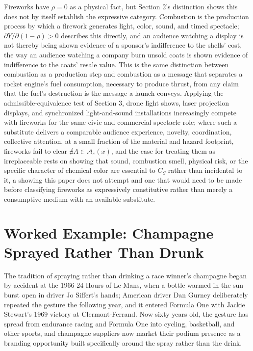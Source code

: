 \documentclass[11pt]{article}
\begin{document}
Fireworks have $\rho = 0$ as a physical fact, but Section 2's distinction shows this does not by itself establish the expressive category. Combustion is the production process by which a firework generates light, color, sound, and timed spectacle; $\partial Y/\partial(1-\rho) > 0$ describes this directly, and an audience watching a display is not thereby being shown evidence of a sponsor's indifference to the shells' cost, the way an audience watching a company burn unsold coats is shown evidence of indifference to the coats' resale value. This is the same distinction between combustion as a production step and combustion as a message that separates a rocket engine's fuel consumption, necessary to produce thrust, from any claim that the fuel's destruction is the message a launch conveys. Applying the admissible-equivalence test of Section 3, drone light shows, laser projection displays, and synchronized light-and-sound installations increasingly compete with fireworks for the same civic and commercial spectacle role; where such a substitute delivers a comparable audience experience, novelty, coordination, collective attention, at a small fraction of the material and hazard footprint, fireworks fail to clear $\nexists A \in \mathcal{A}_\varepsilon(x)$, and the case for treating them as irreplaceable rests on showing that sound, combustion smell, physical risk, or the specific character of chemical color are essential to $C_S$ rather than incidental to it, a showing this paper does not attempt and one that would need to be made before classifying fireworks as expressively constitutive rather than merely a consumptive medium with an available substitute.

\section{Worked Example: Champagne Sprayed Rather Than Drunk}

The tradition of spraying rather than drinking a race winner's champagne began by accident at the 1966 24 Hours of Le Mans, when a bottle warmed in the sun burst open in driver Jo Siffert's hands; American driver Dan Gurney deliberately repeated the gesture the following year, and it entered Formula One with Jackie Stewart's 1969 victory at Clermont-Ferrand. Now sixty years old, the gesture has spread from endurance racing and Formula One into cycling, basketball, and other sports, and champagne suppliers now market their podium presence as a branding opportunity built specifically around the spray rather than the drink.
\end{document}
